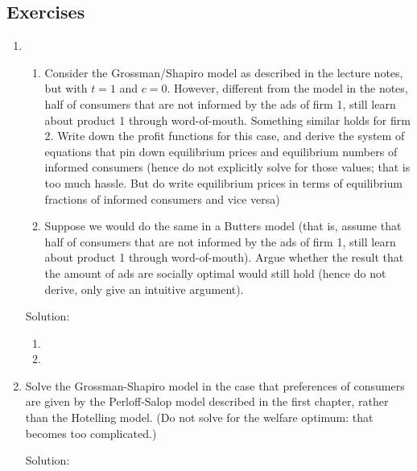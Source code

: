 \subsection{Exercises}
\begin{enumerate}
	\item
	      \begin{enumerate}
		      \item Consider the Grossman/Shapiro model as described in the lecture notes, but
		            with $t = 1$ and $c = 0$. However, different from the model in the notes, half of
		            consumers that are not informed by the ads of firm 1, still learn about product
		            1 through word-of-mouth. Something similar holds for firm 2. Write down the
		            profit functions for this case, and derive the system of equations that pin down
		            equilibrium prices and equilibrium numbers of informed consumers (hence do
		            not explicitly solve for those values; that is too much hassle. But do write
		            equilibrium prices in terms of equilibrium fractions of informed consumers and
		            vice versa)
		      \item Suppose we would do the same in a Butters model (that is, assume that
		            half of consumers that are not informed by the ads of firm 1, still learn about
		            product 1 through word-of-mouth). Argue whether the result that the amount
		            of ads are socially optimal would still hold (hence do not derive, only give an
		            intuitive argument).
	      \end{enumerate}

	      Solution:
	      \begin{enumerate}
		      \item
		      \item
	      \end{enumerate}
	\item Solve the Grossman-Shapiro model in the case that preferences of consumers are
	      given by the Perloff-Salop model described in the first chapter, rather than the
	      Hotelling model. (Do not solve for the welfare optimum: that becomes too complicated.)

	      Solution:
\end{enumerate}

